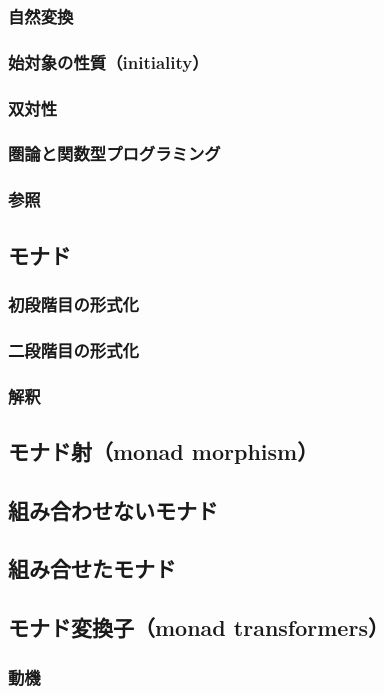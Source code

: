 \documentclass[11pt, oneside]{jsarticle}   	%
\begin{document}
\subsubsection{ 自然変換 }
\subsubsection{ 始対象の性質（initiality）}
\subsubsection{ 双対性 }
\subsubsection{ 圏論と関数型プログラミング }
\subsubsection{ 参照 }
\subsection{ モナド }
\subsubsection{ 初段階目の形式化 }
\subsubsection{ 二段階目の形式化 }
\subsubsection{ 解釈 }
\subsection{ モナド射（monad morphism） }
\subsection{ 組み合わせないモナド }
\subsection{ 組み合せたモナド }
\subsection{ モナド変換子（monad transformers） }
\subsubsection{  動機 }
\end{document}
